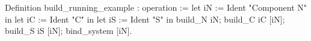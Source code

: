 Definition build_running_example : operation :=
 let iN := Ident "Component N" in
 let iC := Ident "C"           in
 let iS := Ident "S"           in
 build_N iN; build_C iC [iN]; build_S iS [iN]; bind_system [iN].  